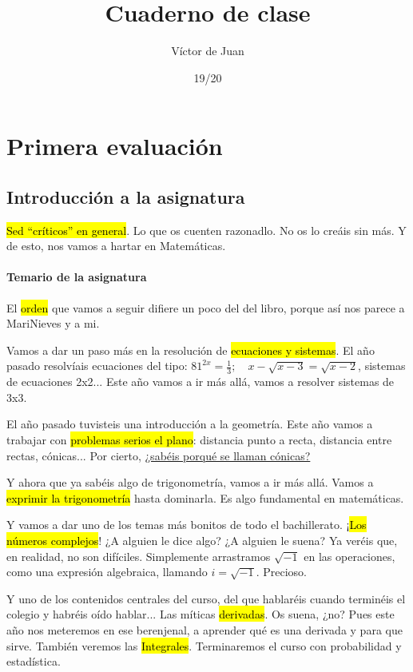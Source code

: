 \documentclass[palatino,nosec]{Docencia}
\title{Cuaderno de clase}
\author{Víctor de Juan}
\date{19/20}
\begin{document}
\pagestyle{plain}
\maketitle
\tableofcontents



\chapter{Primera evaluación}

\section{Introducción a la asignatura}

\hl{Sed “críticos” en general}. Lo que os cuenten razonadlo. No os lo creáis sin más. Y de esto, nos vamos a hartar en Matemáticas.

\subsubsection{Temario de la asignatura}

El \hl{orden} que vamos a seguir difiere un poco del del libro, porque así nos parece a MariNieves y a mi. 

Vamos a dar un paso más en la resolución de \hl{ecuaciones y sistemas}. 
%
El año pasado resolvíais ecuaciones del tipo: $81^{2x} = \frac{1}{3};\quad x-\sqrt{x-3} = \sqrt{x-2}$, sistemas de ecuaciones 2x2... Este año vamos a ir más allá, vamos a resolver sistemas de 3x3. 

El año pasado tuvisteis una introducción a la geometría. Este año vamos a trabajar con \hl{problemas serios el plano}: distancia punto a recta, distancia entre rectas, cónicas... Por cierto, \ul{¿sabéis porqué se llaman cónicas?}

Y ahora que ya sabéis algo de trigonometría, vamos a ir más allá. Vamos a \hl{exprimir la trigonometría} hasta dominarla. Es algo fundamental en matemáticas. 

Y vamos a dar uno de los temas más bonitos de todo el bachillerato. ¡\hl{Los números complejos}! ¿A alguien le dice algo? ¿A alguien le suena? 
%
Ya veréis que, en realidad, no son difíciles. Simplemente arrastramos $\sqrt{-1}$ en las operaciones, como una expresión algebraica, llamando $i=\sqrt{-1}$. 
%
Precioso. 

Y uno de los contenidos centrales del curso, del que hablaréis cuando terminéis el colegio y habréis oído hablar... Las míticas \hl{derivadas}. Os suena, ¿no? 
%
Pues este año nos meteremos en ese berenjenal, a aprender qué es una derivada y para que sirve.
%
También veremos las \hl{Integrales}.
%
Terminaremos el curso con probabilidad y estadística.
\end{document}
